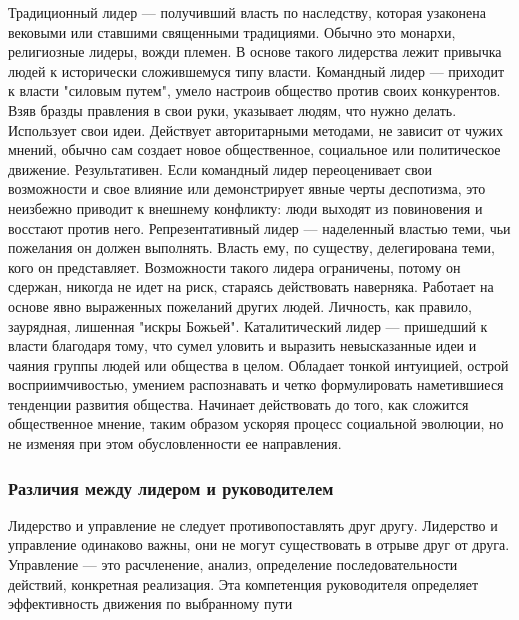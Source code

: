 \documentclass{../industrial-development}
\begin{document}
Традиционный лидер — получивший власть по наследству, которая узаконена вековыми или ставшими священными традициями. Обычно это монархи, религиозные лидеры, вожди племен. В основе такого лидерства лежит привычка людей к исторически сложившемуся типу власти.
Командный лидер — приходит к власти "силовым путем", умело настроив общество против своих конкурентов. Взяв бразды правления в свои руки, указывает людям, что нужно делать. Использует свои идеи. Действует авторитарными методами, не зависит от чужих мнений, обычно сам создает новое общественное, социальное или политическое движение. Результативен. Если командный лидер переоценивает свои возможности и свое влияние или демонстрирует явные черты деспотизма, это неизбежно приводит к внешнему конфликту: люди выходят из повиновения и восстают против него.
Репрезентативный лидер — наделенный властью теми, чьи пожелания он должен выполнять. Власть ему, по существу, делегирована теми, кого он представляет. Возможности такого лидера ограничены, потому он сдержан, никогда не идет на риск, стараясь действовать наверняка. Работает на основе явно выраженных пожеланий других людей. Личность, как правило, заурядная, лишенная "искры Божьей".
Каталитический лидер — пришедший к власти благодаря тому, что сумел уловить и выразить невысказанные идеи и чаяния группы людей или общества в целом. Обладает тонкой интуицией, острой восприимчивостью, умением распознавать и четко формулировать наметившиеся тенденции развития общества. Начинает действовать до того, как сложится общественное мнение, таким образом ускоряя процесс социальной эволюции, но не изменяя при этом обусловленности ее направления.

\begin{frame} \frametitle{Различия между лидером и руководителем}
Лидерство  и управление не следует противопоставлять друг другу. Лидерство и управление одинаково важны, они не могут существовать в отрыве друг от друга. \\

Управление — это расчленение, анализ, определение последовательности действий, конкретная реализация. Эта компетенция руководителя определяет эффективность движения по выбранному пути
\end{frame}

\lecturenotes
\end{document}

